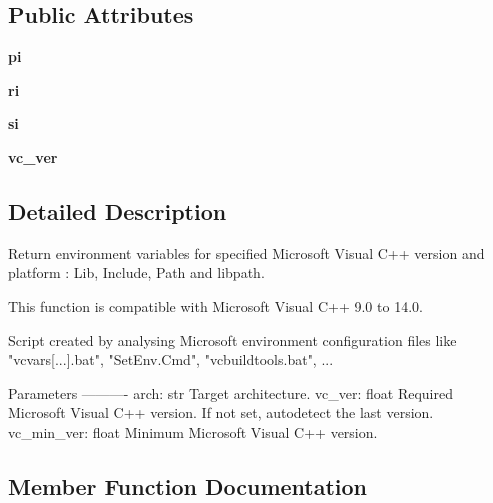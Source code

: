 \subsection*{Public Attributes}
\begin{DoxyCompactItemize}
\item 
\mbox{\label{classsetuptools_1_1msvc_1_1_environment_info_a294a783bc00731fdced426bef20d6495}} 
{\bfseries pi}
\item 
\mbox{\label{classsetuptools_1_1msvc_1_1_environment_info_adc41302e90a01ed9cd6a113758e4fd8c}} 
{\bfseries ri}
\item 
\mbox{\label{classsetuptools_1_1msvc_1_1_environment_info_a37bf9db379b15b1915ce7a598b9c4c48}} 
{\bfseries si}
\item 
\mbox{\label{classsetuptools_1_1msvc_1_1_environment_info_abb2e2027e956412db17b92b2bf10c9f9}} 
{\bfseries vc\+\_\+ver}
\end{DoxyCompactItemize}


\subsection{Detailed Description}
\begin{DoxyVerb}Return environment variables for specified Microsoft Visual C++ version
and platform : Lib, Include, Path and libpath.

This function is compatible with Microsoft Visual C++ 9.0 to 14.0.

Script created by analysing Microsoft environment configuration files like
"vcvars[...].bat", "SetEnv.Cmd", "vcbuildtools.bat", ...

Parameters
----------
arch: str
    Target architecture.
vc_ver: float
    Required Microsoft Visual C++ version. If not set, autodetect the last
    version.
vc_min_ver: float
    Minimum Microsoft Visual C++ version.
\end{DoxyVerb}
 

\subsection{Member Function Documentation}
\mbox{\label{classsetuptools_1_1msvc_1_1_environment_info_a95f7df78e6bc6122e224e05888e98292}} 
